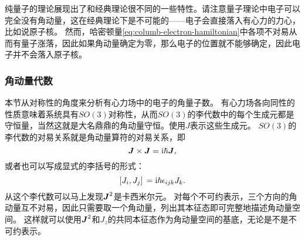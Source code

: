 纯量子的理论展现出了和经典理论很不同的一些特性。请注意量子理论中电子可以完全没有角动量，这在经典理论下是不可能的——电子会直接落入有心力的力心，比如说原子核。
然而，哈密顿量\eqref{eq:columb-electron-hamiltonian}中各项不对易从而有量子涨落，因此如果角动量确定为零，那么电子的位置就不能够确定，因此电子并不会落入原子核。

\subsubsection{角动量代数}\label{sec:algebra-of-angular}

本节从对称性的角度来分析有心力场中的电子的角量子数。
有心力场各向同性的性质意味着系统具有$SO(3)$对称性，从而$SO(3)$的李代数中的每个生成元都是守恒量，当然这就是大名鼎鼎的角动量守恒。使用${J}$表示这些生成元。
$SO(3)$的李代数的对易关系就是角动量算符的对易关系，即
\begin{equation}
    {\vb*{J}} \times {\vb*{J}} = \mathrm{i} \hbar {\vb*{J}},
\end{equation}
或者也可以写成显式的李括号的形式：
\begin{equation}
    \comm*{{J}_i}{{J}_j} = \ii \hbar \epsilon_{ijk} {J}_k.
\end{equation}
从这个李代数可以马上发现${\vb*{J}}^2$是卡西米尔元。
对每个不可约表示，三个方向的角动量互不对易，因此只需要取一个角动量，列出其本征态即可完整地描述角动量空间。
这样就可以使用${\vb*{J}}^2$和${J}_z$的共同本征态作为角动量空间的基底，无论是不是不可约表示。

